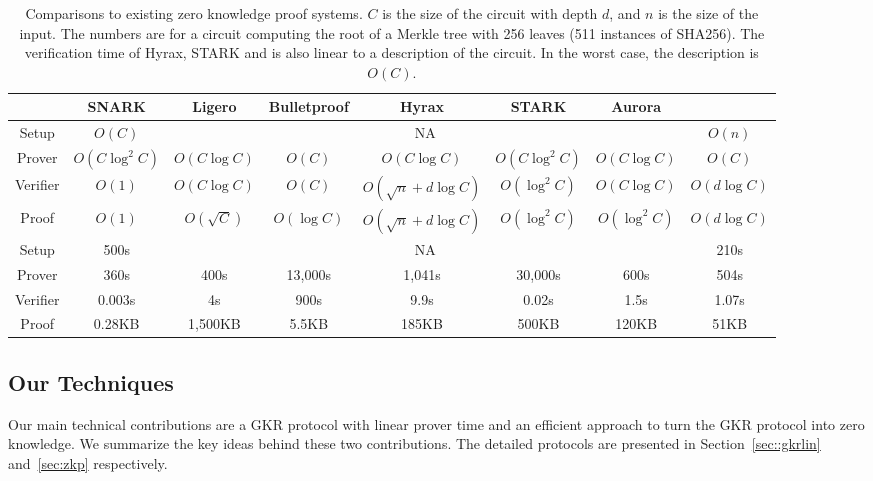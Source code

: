 \begin{table}[h]
	\centering
	{\footnotesize
	\begin{tabular}{|c|c|c|c|c|c|c|c|}
		
		\hline
		&SNARK&Ligero&Bulletproof&Hyrax&STARK&Aurora&\name\\
		\hline
		\hline
		Setup&$O(C)$&\multicolumn{5}{c|}{NA}&$O(n)$\\
		\hline
		Prover&$O(C\log^2C)$&$O(C\log C)$&$O(C)$&$O(C\log C)$&$O(C\log^2 C)$&$O(C\log C)$ &$O(C)$\\
		\hline
		Verifier&$O(1)$&$O(C\log C)$&$O(C)$&$O(\sqrt{n}+d\log C)$&$O(\log^2 C)$&$O(C\log C)$&$O(d\log C)$\\
		\hline
		Proof&$O(1)$&$O(\sqrt{C})$&$O(\log C)$&$O(\sqrt{n}+d\log C)$&$O(\log^2 C)$& $O(\log^2 C)$&$O(d\log C)$\\
		\hline
		\hline
		Setup&500s&\multicolumn{5}{c|}{NA}&210s\\
		\hline
		Prover&360s&400s&13,000s&1,041s&30,000s&600s&504s\\
		\hline
		Verifier&0.003s&4s&900s&9.9s&0.02s&1.5s&1.07s\\
		\hline
		Proof&0.28KB&1,500KB&5.5KB&185KB&500KB&120KB&51KB\\
		\hline
	\end{tabular}
}

\caption{Comparisons to existing zero knowledge proof systems. $C$ is the size of the circuit with depth $d$, and $n$ is the size of the input. The numbers are for a circuit computing the root of a Merkle tree with 256 leaves (511 instances of SHA256). The verification time of Hyrax, STARK and \name is also linear to a description of the circuit. In the worst case, the description is $O(C)$.\protect\footnotemark}\label{tab:zkpall}

\end{table}

\subsection{Our Techniques}
Our main technical contributions are a GKR protocol with linear prover time and an efficient approach to turn the GKR protocol into zero knowledge. We summarize the key ideas behind these two contributions. The detailed protocols are presented in Section~\ref{sec::gkrlin} and~\ref{sec:zkp} respectively.

